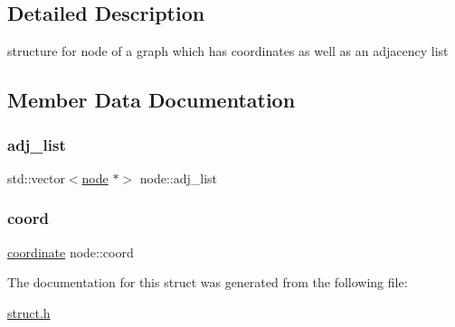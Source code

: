 \subsection{Detailed Description}
structure for node of a graph which has coordinates as well as an adjacency list 

\subsection{Member Data Documentation}
\mbox{\label{structnode_a6bed0ac4a22ac88cc7a22ee8fd5353ec}} 
\subsubsection{\texorpdfstring{adj\+\_\+list}{adj\_list}}
{\footnotesize\ttfamily std\+::vector$<$\hyperlink{structnode}{node} $\ast$$>$ node\+::adj\+\_\+list}

\mbox{\label{structnode_ae4b98bb198d6e90c7095620e0b79dfb3}} 
\subsubsection{\texorpdfstring{coord}{coord}}
{\footnotesize\ttfamily \hyperlink{structcoordinate}{coordinate} node\+::coord}



The documentation for this struct was generated from the following file\+:\begin{DoxyCompactItemize}
\item 
\hyperlink{struct_8h}{struct.\+h}\end{DoxyCompactItemize}
